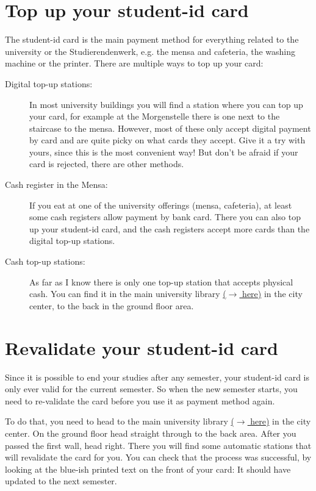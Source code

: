 \section{Top up your student-id card}
The student-id card is the main payment method for everything related to the university or the Studierendenwerk, e.g. the mensa and cafeteria, the washing machine or the printer. There are multiple ways to top up your card:
\begin{description}
    \item[Digital top-up stations:] In most university buildings you will find a station where you can top up your card, for example at the Morgenstelle there is one next to the staircase to the mensa. However, most of these only accept digital payment by card and are quite picky on what cards they accept. Give it a try with yours, since this is the most convenient way! But don't be afraid if your card is rejected, there are other methods.
    \item[Cash register in the Mensa:] If you eat at one of the university offerings (mensa, cafeteria), at least some cash registers allow payment by bank card. There you can also top up your student-id card, and the cash registers accept more cards than the digital top-up stations.
    \item[Cash top-up stations:] As far as I know there is only one top-up station that accepts physical cash. You can find it in the main university library \href{https://maps.app.goo.gl/ifwoMYV6JYGK6dXs7}{($\xrightarrow{}$ here)} in the city center, to the back in the ground floor area.
\end{description}

\section{Revalidate your student-id card}
Since it is possible to end your studies after any semester, your student-id card is only ever valid for the current semester. So when the new semester starts, you need to re-validate the card before you use it as payment method again.

To do that, you need to head to the main university library \href{https://maps.app.goo.gl/ifwoMYV6JYGK6dXs7}{($\xrightarrow{}$ here)} in the city center. On the ground floor head straight through to the back area. After you passed the first wall, head right. There you will find some automatic stations that will revalidate the card for you. You can check that the process was successful, by looking at the blue-ish printed text on the front of your card: It should have updated to the next semester.

